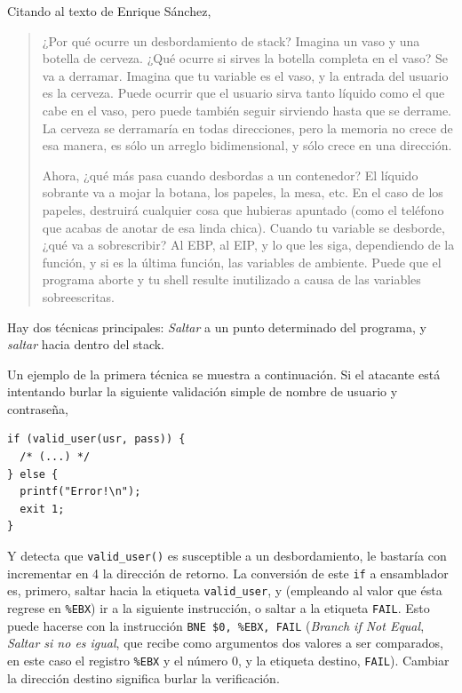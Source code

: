 \documentclass[11pt,fleqn]{book} %
\begin{document}
Citando al texto de Enrique Sánchez,

\begin{quote}
¿Por qué ocurre un desbordamiento de stack? Imagina un vaso y una
botella de cerveza. ¿Qué ocurre si sirves la botella completa en el
vaso? Se va a derramar. Imagina que tu variable es el vaso, y la
entrada del usuario es la cerveza. Puede ocurrir que el usuario sirva
tanto líquido como el que cabe en el vaso, pero puede también seguir
sirviendo hasta que se derrame. La cerveza se derramaría en todas
direcciones, pero la memoria no crece de esa manera, es sólo un
arreglo bidimensional, y sólo crece en una dirección.

Ahora, ¿qué más pasa cuando desbordas a un contenedor? El líquido
sobrante va a mojar la botana, los papeles, la mesa, etc. En el caso
de los papeles, destruirá cualquier cosa que hubieras apuntado (como
el teléfono que acabas de anotar de esa linda chica). Cuando tu
variable se desborde, ¿qué va a sobrescribir? Al EBP, al EIP, y lo
que les siga, dependiendo de la función, y si es la última función,
las variables de ambiente. Puede que el programa aborte y tu shell
resulte inutilizado a causa de las variables sobreescritas.
\end{quote}

Hay dos técnicas principales: \emph{Saltar} a un punto determinado del
programa, y \emph{saltar} hacia dentro del stack.

Un ejemplo de la primera técnica se muestra a continuación. Si el 
atacante está intentando burlar la siguiente validación simple de
nombre de usuario y contraseña,


\begin{verbatim}
if (valid_user(usr, pass)) {
  /* (...) */
} else {
  printf("Error!\n");
  exit 1;
}
\end{verbatim}

Y detecta que \texttt{valid\_user()} es susceptible a un desbordamiento, le
bastaría con incrementar en 4 la dirección de retorno. La conversión
de este \texttt{if} a ensamblador es, primero, saltar hacia la etiqueta
\texttt{valid\_user}, y (empleando al valor que ésta regrese en \texttt{\%EBX}) ir a
la siguiente instrucción, o saltar a la etiqueta \texttt{FAIL}. Esto puede
hacerse con la instrucción \texttt{BNE \$0, \%EBX, FAIL} (\emph{Branch if Not Equal}, \emph{Saltar si no es igual}, que recibe como argumentos dos
valores a ser comparados, en este caso el registro \texttt{\%EBX} y el número
0, y la etiqueta destino, \texttt{FAIL}). Cambiar la
dirección destino significa burlar la verificación.
\end{document}
